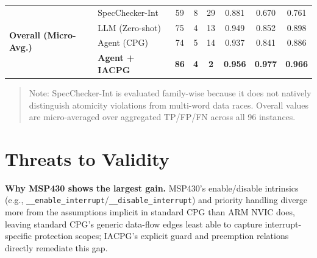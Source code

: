 \documentclass[a4paper,UKenglish,cleveref, autoref, thm-restate]{lipics-v2021}
\begin{document}
\begin{table}[H]
{\begin{tabular}{llcccccc}
\midrule
\midrule
\multirow{4}{*}{\textbf{Overall (Micro-Avg.)}} & SpecChecker-Int & 59 & 8  & 29 & 0.881 & 0.670 & 0.761 \\
                                               & LLM (Zero-shot) & 75 & 4  & 13 & 0.949 & 0.852 & 0.898 \\
                                               & Agent (CPG)     & 74 & 5  & 14 & 0.937 & 0.841 & 0.886 \\
                                               & \textbf{Agent + IACPG} & \textbf{86} & \textbf{4} & \textbf{2} & \textbf{0.956} & \textbf{0.977} & \textbf{0.966} \\
\bottomrule
\end{tabular}
}
  \begin{quote}
    {\footnotesize Note: SpecChecker-Int is evaluated family-wise because it does not natively distinguish atomicity violations from multi-word data races. Overall values are micro-averaged over aggregated TP/FP/FN across all 96 instances.}
  \end{quote}
\end{table}

\FloatBarrier

\section{Threats to Validity}


\textbf{Why MSP430 shows the largest gain.} MSP430's enable/disable intrinsics (e.g., \texttt{\_\_enable\_interrupt}/\texttt{\_\_disable\_interrupt}) and priority handling diverge more from the assumptions implicit in standard CPG than ARM NVIC does, leaving standard CPG's generic data-flow edges least able to capture interrupt-specific protection scopes; IACPG's explicit guard and preemption relations directly remediate this gap.
\end{document}
